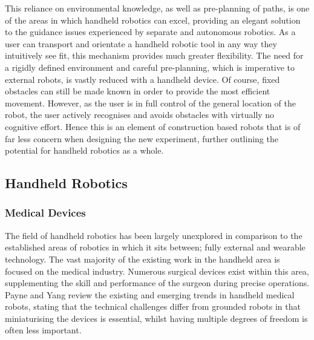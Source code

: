 \documentclass[11pt]{article}
\begin{document}
This reliance on environmental knowledge, as well as pre-planning of paths, is one of the areas in which handheld robotics can excel, providing an elegant solution to the guidance issues experienced by separate and autonomous robotics. As a user can transport and orientate a handheld robotic tool in any way they intuitively see fit, this mechanism provides much greater flexibility. The need for a rigidly defined environment and careful pre-planning, which is imperative to external robots, is vastly reduced with a handheld device. Of course, fixed obstacles can still be made known in order to provide the most efficient movement. However, as the user is in full control of the general location of the robot, the user actively recognises and avoids obstacles with virtually no cognitive effort. Hence this is an element of construction based robots that is of far less concern when designing the new experiment, further outlining the potential for handheld robotics as a whole. 

\pagebreak












\subsection{Handheld Robotics} \label{handheld}
\subsubsection{Medical Devices}
The field of handheld robotics has been largely unexplored in comparison to the established areas of robotics in which it sits between; fully external and wearable technology. The vast majority of the existing work in the handheld area is focused on the medical industry. Numerous surgical devices exist within this area, supplementing the skill and performance of the surgeon during precise operations. Payne and Yang \cite{Payne2014} review the existing and emerging trends in handheld medical robots, stating that the technical challenges differ from grounded robots in that miniaturising the devices is essential, whilst having multiple degrees of freedom is often less important.
\end{document}
